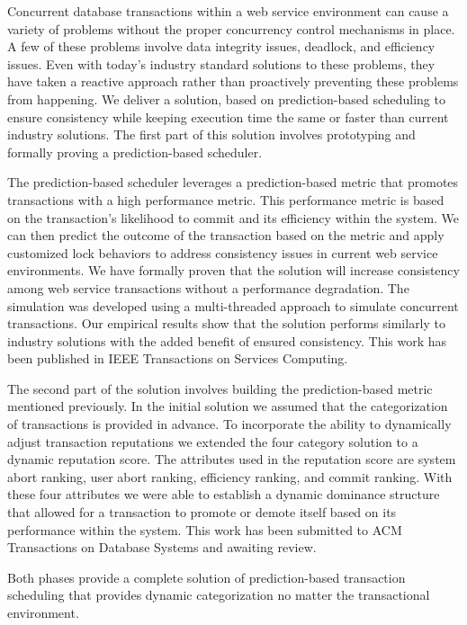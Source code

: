 Concurrent database transactions within a web service environment can cause a variety of problems without the proper concurrency control mechanisms in place. A few of these problems involve data integrity issues, deadlock, and efficiency issues. Even with today's industry standard solutions to these problems, they have taken a reactive approach rather than proactively preventing these problems from happening. We deliver a solution, based on prediction-based scheduling to ensure consistency while keeping execution time the same or faster than current industry solutions. The first part of this solution involves prototyping and formally proving a prediction-based scheduler.

The prediction-based scheduler leverages a prediction-based metric that promotes transactions with a high performance metric. This performance metric is based on the transaction's likelihood to commit and its efficiency within the system. We can then predict the outcome of the transaction based on the metric and apply customized lock behaviors to address consistency issues in current web service environments. We have formally proven that the solution will increase consistency among web service transactions without a performance degradation. The simulation was developed using a multi-threaded approach to simulate concurrent transactions. Our empirical results  show that the solution performs similarly to industry solutions with the added benefit of ensured consistency. This work has been published in IEEE Transactions on Services Computing.

The second part of the solution involves building the prediction-based metric mentioned previously. In the initial solution we assumed that the categorization of transactions is provided in advance. To incorporate the ability to dynamically adjust transaction reputations we extended the four category solution to a dynamic reputation score. The attributes used in the reputation score are system abort ranking, user abort ranking, efficiency ranking, and commit ranking. With these four attributes we were able to establish a dynamic dominance structure that allowed for a transaction to promote or demote itself based on its performance within the system. This work has been submitted to ACM Transactions on Database Systems and awaiting review.

Both phases provide a complete solution of prediction-based transaction scheduling that provides dynamic categorization no matter the transactional environment. 


